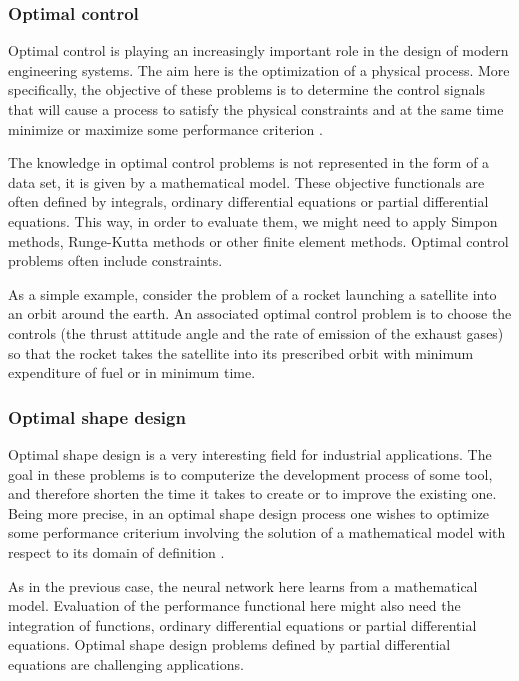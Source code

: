 \subsubsection{Optimal control}

Optimal control is playing an increasingly important role in the
design of modern engineering systems. The aim
here is the optimization of a physical
process. More specifically, the objective of these problems is to
determine the control signals that will cause a process to satisfy
the physical constraints and at the same time minimize or maximize
some performance criterion \cite{Kirk1970} \cite{BalsaCanto2001}. 

The knowledge in optimal control problems is not represented in the form of a data set, it is given by a mathematical model. 
These objective functionals are often defined by integrals, ordinary differential equations or partial differential equations. 
This way, in order to evaluate them, we might need to apply Simpon methods, Runge-Kutta methods or other finite element methods. 
Optimal control problems often include constraints. 

As a simple example, consider the problem of a rocket launching a
satellite into an orbit around the earth. An associated optimal
control problem is to choose the controls (the thrust attitude angle
and the rate of emission of the exhaust gases) so that the rocket
takes the satellite into its prescribed orbit with minimum
expenditure of fuel or in minimum time.

\subsubsection{Optimal shape design}

Optimal shape design is a very interesting field for industrial
applications. The goal in these problems
is to computerize the development process of some tool, and
therefore shorten the time it takes to create or to improve the
existing one. Being more precise, in an optimal shape design process
one wishes to optimize some performance criterium involving the
solution of a mathematical model with respect to its domain of
definition \cite{Bucur2005}. 

As in the previous case, the neural network here learns from a mathematical model. 
Evaluation of the performance functional here might also need the integration of functions, ordinary differential equations or partial differential equations. 
Optimal shape design problems defined by partial differential equations are challenging applications. 

